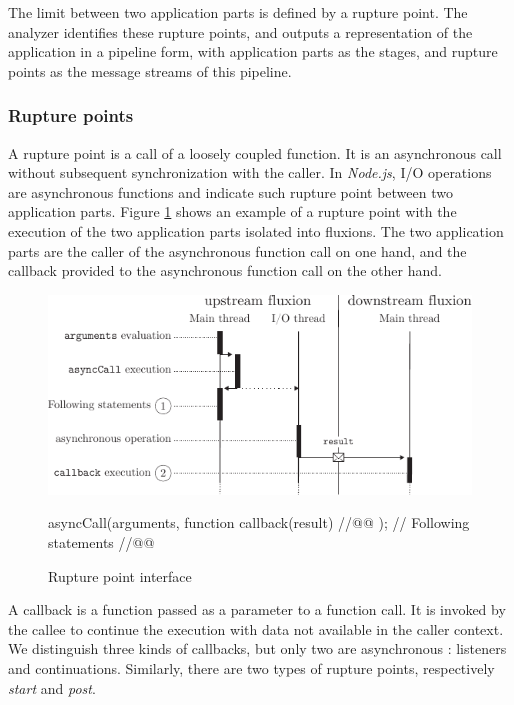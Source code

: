 The limit between two application parts is defined by a rupture point.
The analyzer identifies these rupture points, and outputs a representation of the application in a pipeline form, with application parts as the stages, and rupture points as the message streams of this pipeline.

\subsubsection{Rupture points} \label{section:compiler:analyzer:rupture}

A rupture point is a call of a loosely coupled function.
It is an asynchronous call without subsequent synchronization with the caller.
In \textit{Node.js}, I/O operations are asynchronous functions and indicate such rupture point between two application parts.
Figure \ref{fig:basicrp} shows an example of a rupture point with the execution of the two application parts isolated into fluxions.
The two application parts are the caller of the asynchronous function call on one hand, and the callback provided to the asynchronous function call on the other hand.

\begin{figure}[h!]
\begin{center}
  \includegraphics[width=\linewidth]{resources/basicrp.pdf}
  \begin{code}
asyncCall(arguments, function callback(result){ //@@ });
// Following statements //@@
  \end{code}
  \caption{Rupture point interface}
  \label{fig:basicrp}
\end{center}
\end{figure}

A callback is a function passed as a parameter to a function call.
It is invoked by the callee to continue the execution with data not available in the caller context.
We distinguish three kinds of callbacks, but only two are asynchronous : listeners and continuations.
Similarly, there are two types of rupture points, respectively \textit{start} and \textit{post}.


